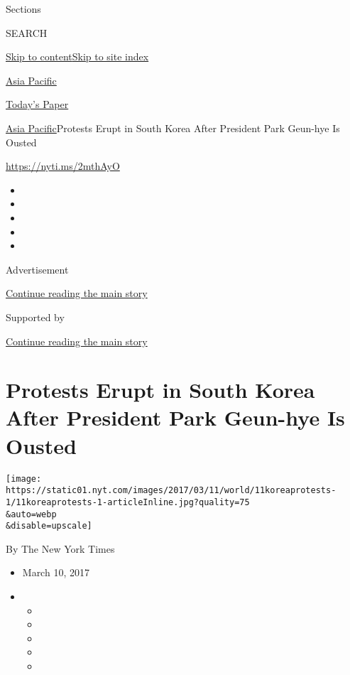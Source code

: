 Sections

SEARCH

\protect\hyperlink{site-content}{Skip to
content}\protect\hyperlink{site-index}{Skip to site index}

\href{https://www.nytimes.com/section/world/asia}{Asia Pacific}

\href{https://myaccount.nytimes.com/auth/login?response_type=cookie\&client_id=vi}{}

\href{https://www.nytimes.com/section/todayspaper}{Today's Paper}

\href{/section/world/asia}{Asia Pacific}\textbar{}Protests Erupt in
South Korea After President Park Geun-hye Is Ousted

\url{https://nyti.ms/2mthAyO}

\begin{itemize}
\item
\item
\item
\item
\item
\end{itemize}

Advertisement

\protect\hyperlink{after-top}{Continue reading the main story}

Supported by

\protect\hyperlink{after-sponsor}{Continue reading the main story}

\hypertarget{protests-erupt-in-south-korea-after-president-park-geun-hye-is-ousted}{%
\section{Protests Erupt in South Korea After President Park Geun-hye Is
Ousted}\label{protests-erupt-in-south-korea-after-president-park-geun-hye-is-ousted}}

\texttt{[image: https://static01.nyt.com/images/2017/03/11/world/11koreaprotests-1/11koreaprotests-1-articleInline.jpg?quality=75\\\&auto=webp\\\&disable=upscale]}

By The New York Times

\begin{itemize}
\item
  March 10, 2017
\item
  \begin{itemize}
  \item
  \item
  \item
  \item
  \item
  \end{itemize}
\end{itemize}

